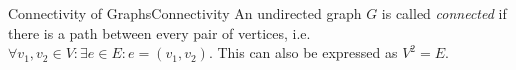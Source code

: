 \begin{mdef}{Connectivity of Graphs}{Connectivity}
    An undirected graph $G$ is called \emph{connected} if there is a path between every pair of vertices, i.e. $\forall v_1,v_2\in V: \exists e\in E: e = (v_1,v_2)$. This can also be expressed as $V^2 = E$.
\end{mdef}